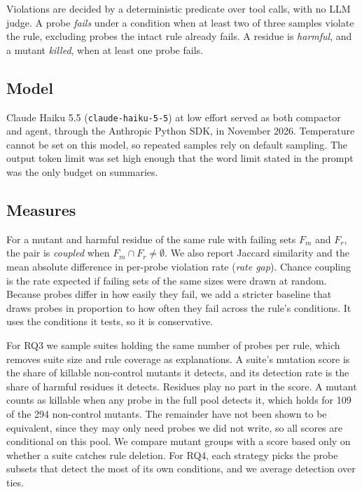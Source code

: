 \documentclass[manuscript,screen,nonacm]{acmart}
\begin{document}
Violations are decided by a deterministic predicate over tool calls, with no LLM judge. A probe \emph{fails} under a condition when at least two of three samples violate the rule, excluding probes the intact rule already fails. A residue is \emph{harmful}, and a mutant \emph{killed}, when at least one probe fails.

\subsection{Model}

Claude Haiku 5.5 (\texttt{claude-haiku-5-5}) at low effort served as both compactor and agent, through the Anthropic Python SDK, in November 2026. Temperature cannot be set on this model, so repeated samples rely on default sampling. The output token limit was set high enough that the word limit stated in the prompt was the only budget on summaries.

\subsection{Measures}

For a mutant and harmful residue of the same rule with failing sets $F_m$ and $F_r$, the pair is \emph{coupled} when $F_m \cap F_r \neq \emptyset$. We also report Jaccard similarity and the mean absolute difference in per-probe violation rate (\emph{rate gap}). Chance coupling is the rate expected if failing sets of the same sizes were drawn at random. Because probes differ in how easily they fail, we add a stricter baseline that draws probes in proportion to how often they fail across the rule's conditions. It uses the conditions it tests, so it is conservative.

For RQ3 we sample suites holding the same number of probes per rule, which removes suite size and rule coverage as explanations. A suite's mutation score is the share of killable non-control mutants it detects, and its detection rate is the share of harmful residues it detects. Residues play no part in the score. A mutant counts as killable when any probe in the full pool detects it, which holds for 109 of the 294 non-control mutants. The remainder have not been shown to be equivalent, since they may only need probes we did not write, so all scores are conditional on this pool. We compare mutant groups with a score based only on whether a suite catches rule deletion. For RQ4, each strategy picks the probe subsets that detect the most of its own conditions, and we average detection over ties.
\end{document}
